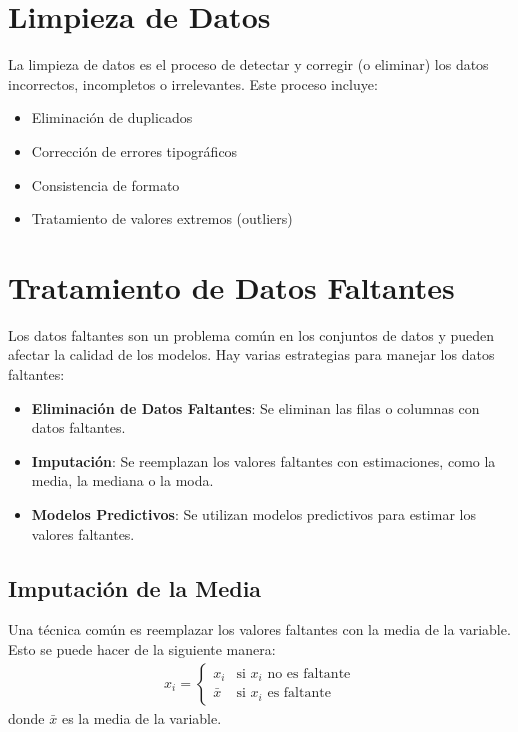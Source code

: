 \documentclass[a4paper]{report} %
\begin{document}
\section{Limpieza de Datos}

La limpieza de datos es el proceso de detectar y corregir (o eliminar) los datos incorrectos, incompletos o irrelevantes. Este proceso incluye:
\begin{itemize}
    \item Eliminaci\'on de duplicados
    \item Correcci\'on de errores tipogr\'aficos
    \item Consistencia de formato
    \item Tratamiento de valores extremos (outliers)
\end{itemize}

\section{Tratamiento de Datos Faltantes}

Los datos faltantes son un problema com\'un en los conjuntos de datos y pueden afectar la calidad de los modelos. Hay varias estrategias para manejar los datos faltantes:
\begin{itemize}
    \item \textbf{Eliminaci\'on de Datos Faltantes}: Se eliminan las filas o columnas con datos faltantes.
    \item \textbf{Imputaci\'on}: Se reemplazan los valores faltantes con estimaciones, como la media, la mediana o la moda.
    \item \textbf{Modelos Predictivos}: Se utilizan modelos predictivos para estimar los valores faltantes.
\end{itemize}

\subsection{Imputaci\'on de la Media}

Una t\'ecnica com\'un es reemplazar los valores faltantes con la media de la variable. Esto se puede hacer de la siguiente manera:
\begin{eqnarray*}
x_i = \begin{cases} 
      x_i & \text{si } x_i \text{ no es faltante} \\
      \bar{x} & \text{si } x_i \text{ es faltante}
   \end{cases}
\end{eqnarray*}
donde $\bar{x}$ es la media de la variable.
\end{document}
